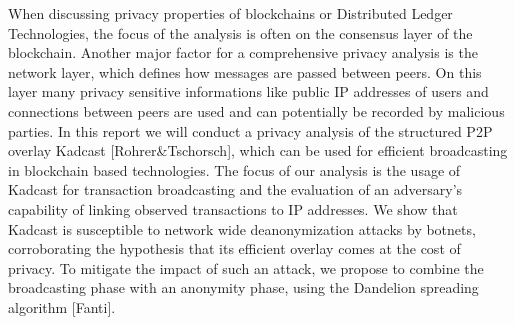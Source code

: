 When discussing privacy properties of blockchains or Distributed Ledger Technologies, the
focus of the analysis is often on the consensus layer of the blockchain.
Another major factor for a comprehensive privacy analysis is
the network layer, which defines how messages are passed between peers.
On this layer many privacy sensitive informations like public IP addresses of users and connections between peers
are used and can potentially be recorded by malicious parties.
In this report we will conduct a privacy analysis of the structured P2P overlay Kadcast [Rohrer\&Tschorsch],
which can be used for efficient broadcasting in blockchain based technologies.
The focus of our analysis is the usage of Kadcast for transaction broadcasting and the evaluation of an adversary's capability
of linking observed transactions to IP addresses.
We show that Kadcast is susceptible to network wide deanonymization attacks by botnets, corroborating the hypothesis that its
efficient overlay comes at the cost of privacy.
To mitigate the impact of such an attack, we propose to combine the broadcasting phase with an anonymity phase, using
the Dandelion spreading algorithm [Fanti].
